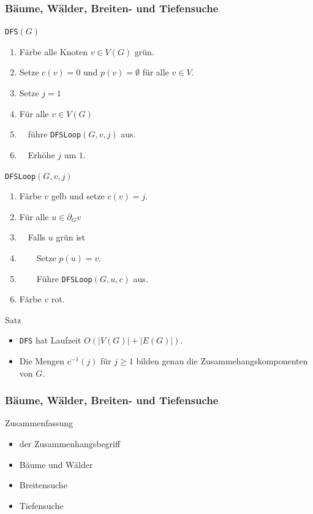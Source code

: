 \documentclass[aspectratio=1610, 11pt]{beamer}
\newcommand{\mytitle}{B\"aume, W\"alder, Breiten- und Tiefensuche}
\begin{document}
\begin{frame}\frametitle{\mytitle}
	\begin{overprint}
		\begin{exampleblock}{{\tt DFS}$(G)$}
			\begin{enumerate}
				\item F\"arbe alle Knoten $v\in V(G)$ gr\"un.
				\item Setze $c(v)=0$ und $p(v)=\emptyset$ f\"ur alle $v\in V$.
				\item Setze $j=1$
				\item F\"ur alle $v\in V(G)$
				\item $\quad$f\"uhre {\tt DFSLoop}$(G,v,j)$ aus.
				\item $\quad$Erh\"ohe $j$ um $1$.
			\end{enumerate}
		\end{exampleblock}
		\begin{exampleblock}{{\tt DFSLoop}$(G,v,j)$}
			\begin{enumerate}
				\item F\"arbe $v$ gelb und setze $c(v)=j$.
				\item F\"ur alle $u\in\partial_Gv$
				\item $\quad$Falls $u$ gr\"un ist
				\item $\quad\quad$Setze $p(u)=v$.
				\item $\quad\quad$F\"uhre {\tt DFSLoop}$(G,u,c)$ aus.
				\item F\"arbe $v$ rot.
			\end{enumerate}
		\end{exampleblock}
		\begin{block}{Satz}
			\begin{itemize}
				\item {\tt DFS} hat Laufzeit $O(|V(G)|+|E(G)|)$.
				\item Die Mengen $c^{-1}(j)$ f\"ur $j\geq1$ bilden genau die Zusammehangskomponenten von $G$.
			\end{itemize}
		\end{block}
	\end{overprint}
\end{frame}

\begin{frame}\frametitle{\mytitle}
	\begin{exampleblock}{Zusammenfassung}
		\begin{itemize}
			\item der Zusammenhangsbegriff
			\item B\"aume und W\"alder
			\item Breitensuche
			\item Tiefensuche
		\end{itemize}
	\end{exampleblock}
\end{frame}
\end{document}
